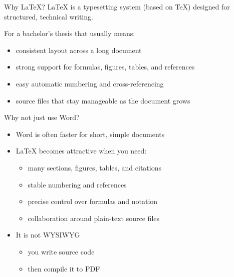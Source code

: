 \documentclass{beamer}
\begin{document}
\begin{frame}{Why \LaTeX?}
    \LaTeX{} is a typesetting system (based on \TeX) designed for structured, technical writing.

    \medskip
    For a bachelor's thesis that usually means:
    \begin{itemize}
        \item consistent layout across a long document
        \item strong support for formulas, figures, tables, and references
        \item easy automatic numbering and cross-referencing
        \item source files that stay manageable as the document grows
    \end{itemize}
\end{frame}

\begin{frame}{Why not just use Word?}
    \begin{itemize}
        \item Word is often faster for short, simple documents
        \item \LaTeX{} becomes attractive when you need:
              \begin{itemize}
                  \item many sections, figures, tables, and citations
                  \item stable numbering and references
                  \item precise control over formulas and notation
                  \item collaboration around plain-text source files
              \end{itemize}
        \item It is not WYSIWYG
              \begin{itemize}
                  \item you write source code
                  \item then compile it to PDF
              \end{itemize}
    \end{itemize}
\end{frame}
\end{document}
